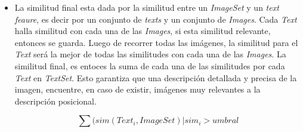 \begin{itemize}
    \item La similitud final esta dada por la similitud entre un \textit{ImageSet} y un \textit{text feaure}, es decir por un conjunto de \textit{texts} y un conjunto de \textit{Images}. Cada \textit{Text} halla similitud con cada una de las \textit{Images}, si esta similitud relevante, entonces se guarda. Luego de recorrer todas las im\'agenes, la similitud para el \textit{Text} ser\'a la mejor de todas las similitudes con cada una de las \textit{Images}. La similitud final, es entoces la suma de cada una de las similitudes por cada \textit{Text} en \textit{TextSet}. Esto garantiza que una descripci\'on detallada y precisa de la imagen, encuentre, en caso de existir, im\'agenes muy relevantes a la descripci\'on posicional.
        
        \[\sum(sim(Text_i, ImageSet) | sim_i>umbral\]
    


\end{itemize}


